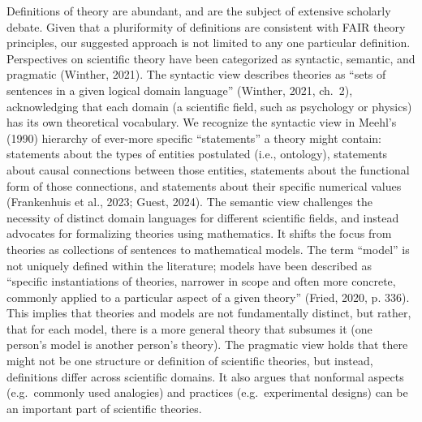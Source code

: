 \documentclass[
  man, noextraspace,floatsintext]{apa7}
\begin{document}
Definitions of theory are abundant, and are the subject of extensive scholarly debate.
Given that a pluriformity of definitions are consistent with FAIR theory principles,
our suggested approach is not limited to any one particular definition.
Perspectives on scientific theory have been categorized as syntactic, semantic, and pragmatic (Winther, 2021).
The syntactic view describes theories as ``sets of sentences in a given logical domain language'' (Winther, 2021, ch.~2),
acknowledging that each domain (a scientific field, such as psychology or physics) has its own theoretical vocabulary.
We recognize the syntactic view in Meehl's (1990) hierarchy of ever-more specific ``statements'' a theory might contain:
statements about the types of entities postulated (i.e., ontology),
statements about causal connections between those entities,
statements about the functional form of those connections,
and statements about their specific numerical values (Frankenhuis et al., 2023; Guest, 2024).
The semantic view challenges the necessity of distinct domain languages for different scientific fields, and instead advocates for formalizing theories using mathematics.
It shifts the focus from theories as collections of sentences to mathematical models.
The term ``model'' is not uniquely defined within the literature;
models have been described as ``specific instantiations of theories, narrower in scope and often more concrete, commonly applied to a particular aspect of a given theory'' (Fried, 2020, p. 336).
This implies that theories and models are not fundamentally distinct, but rather, that for each model, there is a more general theory that subsumes it (one person's model is another person's theory).
The pragmatic view holds that there might not be one structure or definition of scientific theories, but instead, definitions differ across scientific domains.
It also argues that nonformal aspects (e.g.~commonly used analogies) and practices (e.g.~experimental designs) can be an important part of scientific theories.
\end{document}
